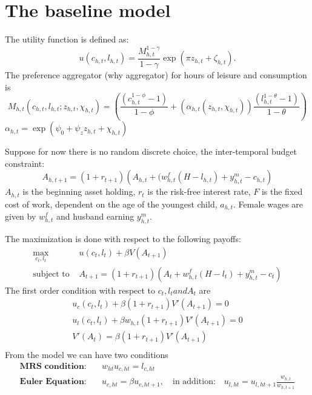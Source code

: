 \section{The baseline model}

The utility function is defined as:
\[ u(c_{h,t},l_{h,t}) = \frac{M^{1-\gamma}_{h,t}}{1 - \gamma} \exp{( \pi z_{h,t} + \zeta_{h,t} )} .\]
The preference aggregator (why aggregator) for hours of leisure and consumption is
\[ M_{h,t}(c_{h,t},l_{h,t};z_{h,t},\chi_{h,t}) = \left( \frac{(c_{h,t}^{1 - \phi} - 1)}{1 - \phi} + (\alpha_{h,t}(z_{h,t},\chi_{h,t})) \frac{(l_{h,t}^{1 - \theta} -1)}{ 1 - \theta}\right) \]
$\alpha_{h,t}= \exp{(\psi_0 + \psi_z z_{h,t} + \chi_{h,t})}$

Suppose for now there is no random discrete choice, the inter-temporal budget constraint:
\[ A_{h,t+1} = (1 + r_{t+1}) \left( A_{h,t} + (w_{h,t}^f(H-l_{h,t}) + y_{h,t}^m - c_{h,t} \right)\]
$A_{h,t}$ is the beginning asset holding, $r_t$ is the risk-free interest rate, $F$ is the fixed cost of work, dependent on the age of the youngest child, $a_{h,t}$. Female wages are given by $w_{h,t}^f$ and husband earning $y_{h,t}^m$.

The maximization is done with respect to the following payoffs:
\[\begin{split} \max_{c_t,l_t} & u(c_t,l_t) + \beta V(A_{t+1}) \\
\text{subject to } & A_{t+1} = (1 + r_{t+1}) \left( A_{t} + w_{h,t}^f(H-l_{t}) + y_{h,t}^m - c_{t} \right)
\end{split}\]
The first order condition with respect to $c_t, l_t and A_t$ are \[ \begin{split}
  u_c(c_t,l_t) + \beta (1+r_{t+1}) V'(A_{t+1}) = 0 \\
  u_l(c_t,l_t) + \beta w_{h,t} (1+r_{t+1}) V'(A_{t+1}) = 0 \\
  V'(A_t) = \beta (1+r_{t+1}) V'(A_{t+1}) \\
\end{split} \]
From the model we can have two conditions
\[ \begin{split}
  \textbf{MRS condition:}& \quad w_{ht} u_{c,ht} = l_{c,ht}\\
  \textbf{Euler Equation:}& \quad u_{c,ht} = \beta u_{c,ht+1}, \quad \text{in addition:}\quad u_{l,ht} = u_{l,ht+1} \frac{w_{h,t}}{w_{h,t+1}}
\end{split} \]

